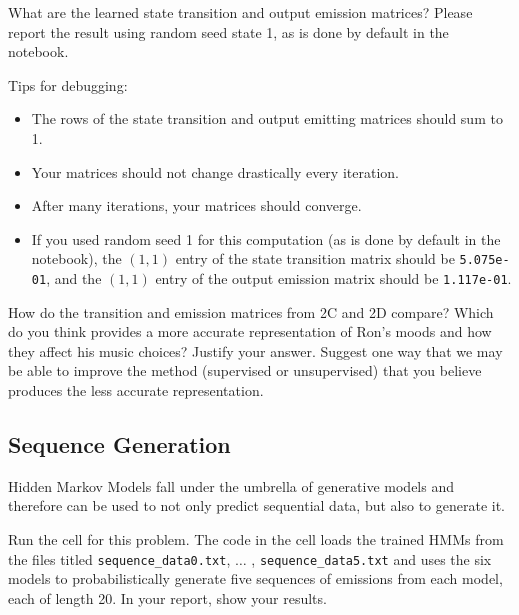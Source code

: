 What are the learned state transition and output emission matrices? Please report the result using random seed state 1, as is done by default in the notebook.

Tips for debugging:
\begin{itemize}
  \item The rows of the state transition and output emitting matrices should sum to 1.
  \item Your matrices should not change drastically every iteration.
  \item After many iterations, your matrices should converge.
  \item If you used random seed 1 for this computation (as is done by default in the notebook), the \((1,1)\) entry of the state transition matrix should be \verb|5.075e-01|, and the \((1,1)\) entry of the output emission matrix should be \verb|1.117e-01|.
\end{itemize}

\begin{solution}
\end{solution}

\problem[5] How do the transition and emission matrices from 2C and 2D compare? Which do you think provides a more accurate representation of Ron's moods and how they affect his music choices? Justify your answer. Suggest one way that we may be able to improve the method (supervised or unsupervised) that you believe produces the less accurate representation. 

\begin{solution}
\end{solution}

\subsection{Sequence Generation}
Hidden Markov Models fall under the umbrella of generative models and therefore can be used to not only predict sequential data, but also to generate it.

\problem[5] Run the cell for this problem. The code in the cell loads the trained HMMs from the files titled \texttt{sequence_data0.txt}, $\ldots$ , \texttt{sequence_data5.txt} and uses the six models to probabilistically generate five sequences of emissions from each model, each of length 20. In your report, show your results. 

\begin{solution}
\end{solution}

